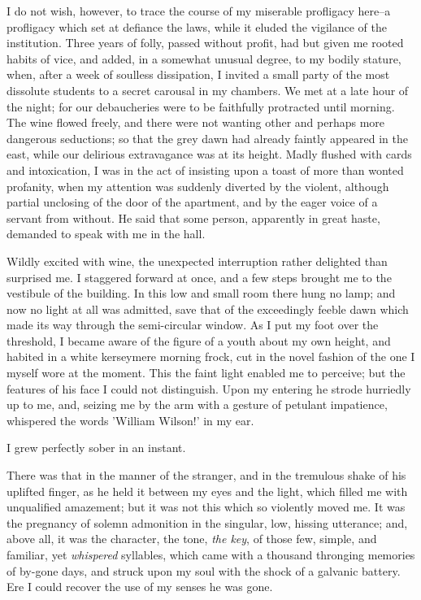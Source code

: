 \documentclass[12pt]{book}
\begin{document}
     I do not wish, however, to trace the course of my miserable
profligacy here--a profligacy which set at defiance the laws, while
it eluded the vigilance of the institution.  Three years of folly,
passed without profit, had but given me rooted habits of vice, and
added, in a somewhat unusual degree, to my bodily stature, when,
after a week of soulless dissipation, I invited a small party of
the most dissolute students to a secret carousal in my chambers. 
We met at a late hour of the night; for our debaucheries were to be
faithfully protracted until morning.  The wine flowed freely, and
there were not wanting other and perhaps more dangerous 
seductions; so that the grey dawn had already faintly appeared in
the east, while our delirious extravagance was at its height. 
Madly flushed with cards and intoxication, I was in the act of
insisting upon a toast of more than wonted profanity, when my
attention was suddenly diverted by the violent, although partial
unclosing of the door of the apartment, and by the eager voice of
a servant from without.  He said that some person, apparently in
great haste, demanded to speak with me in the hall.

     Wildly excited with wine, the unexpected interruption rather
delighted than surprised me.  I staggered forward at once, and a
few steps brought me to the vestibule of the building.  In this low
and small room there hung no lamp; and now no light at all was
admitted, save that of the exceedingly feeble dawn which made its
way through the semi-circular window.  As I put my foot over the
threshold, I became aware of the figure of a youth about my own
height, and habited in a white kerseymere morning frock, cut in the
novel fashion of the one I myself wore at the moment.  This the
faint light enabled me to perceive; but the features of his face I
could not distinguish.  Upon my entering he strode hurriedly up to
me, and, seizing me by the arm with a gesture of petulant
impatience, whispered the words 'William Wilson!' in my ear.

     I grew perfectly sober in an instant.

     There was that in the manner of the stranger, and in the
tremulous shake of his uplifted finger, as he held it between my
eyes and the light, which filled me with unqualified amazement; but
it was not this which so violently moved me.  It was the pregnancy
of solemn admonition in the singular, low, hissing utterance; and,
above all, it was the character, the tone, \emph{the key}, of those
few, simple, and familiar, yet \emph{whispered} syllables, which came
with a thousand thronging memories of by-gone days, and struck upon
my soul with the shock of a galvanic battery.  Ere I could recover
the use of my senses he was gone.
\end{document}

